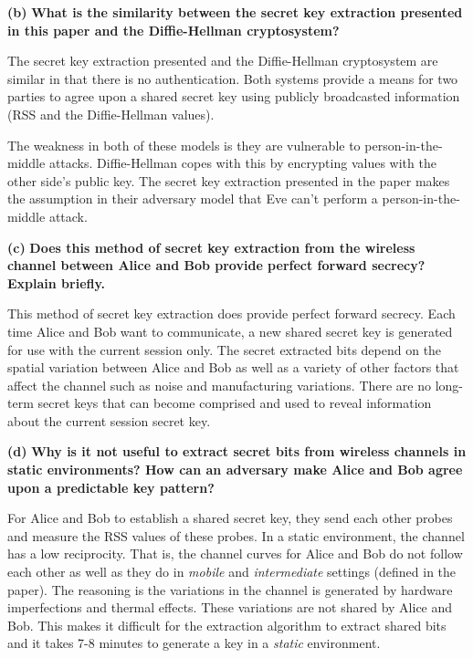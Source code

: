 \documentclass[11pt]{article}
\renewcommand\part[1]{\vspace{.10in}\textbf{(#1)}}
\begin{document}
\part{b} \textbf{What is the similarity between the secret key extraction presented in this paper and the Diffie-Hellman cryptosystem?}

The secret key extraction presented and the Diffie-Hellman cryptosystem are similar in that there is no authentication. Both systems provide a means for two parties to agree upon a shared secret key using publicly broadcasted information (RSS and the Diffie-Hellman values). 

The weakness in both of these models is they are vulnerable to person-in-the-middle attacks. Diffie-Hellman copes with this by encrypting values with the other side's public key. The secret key extraction presented in the paper makes the assumption in their adversary model that Eve can't perform a person-in-the-middle attack.

\part{c} \textbf{Does this method of secret key extraction from the wireless channel between Alice and Bob provide perfect forward secrecy? Explain briefly.}

This method of secret key extraction does provide perfect forward secrecy. Each time Alice and Bob want to communicate, a new shared secret key is generated for use with the current session only. The secret extracted bits depend on the spatial variation between Alice and Bob as well as a variety of other factors that affect the channel such as noise and manufacturing variations. There are no long-term secret keys that can become comprised and used to reveal information about the current session secret key.


\part{d} \textbf{Why is it not useful to extract secret bits from wireless channels in static environments? How can an adversary make Alice and Bob agree upon a predictable key pattern?}

For Alice and Bob to establish a shared secret key, they send each other probes and measure the RSS values of these probes. In a static environment, the channel has a low reciprocity. That is, the channel curves for Alice and Bob do not follow each other as well as they do in \textit{mobile} and \textit{intermediate} settings (defined in the paper). The reasoning is the variations in the channel is generated by hardware imperfections and thermal effects. These variations are not shared by Alice and Bob. This makes it difficult for the extraction algorithm to extract shared bits and it takes 7-8 minutes to generate a key in a \textit{static} environment.
\end{document}
